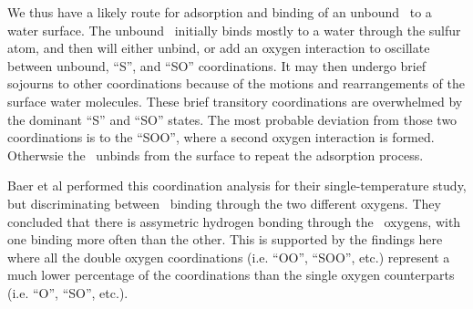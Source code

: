 We thus have a likely route for adsorption and binding of an unbound \suldiox~to a water surface. The unbound \suldiox~initially binds mostly to a water through the sulfur atom, and then will either unbind, or add an oxygen interaction to oscillate between unbound, ``S'', and ``SO'' coordinations. It may then undergo brief sojourns to other coordinations because of the motions and rearrangements of the surface water molecules. These brief transitory coordinations are overwhelmed by the dominant ``S'' and ``SO'' states. The most probable deviation from those two coordinations is to the ``SOO'', where a second oxygen interaction is formed. Otherwsie the \suldiox~unbinds from the surface to repeat the adsorption process.

Baer et al performed this coordination analysis for their single-temperature study, but discriminating between \suldiox~binding through the two different oxygens. They concluded that there is assymetric hydrogen bonding through the \suldiox~oxygens, with one binding more often than the other. This is supported by the findings here where all the double oxygen coordinations (i.e. ``OO'', ``SOO'', etc.) represent a much lower percentage of the coordinations than the single oxygen counterparts (i.e. ``O'', ``SO'', etc.). 



